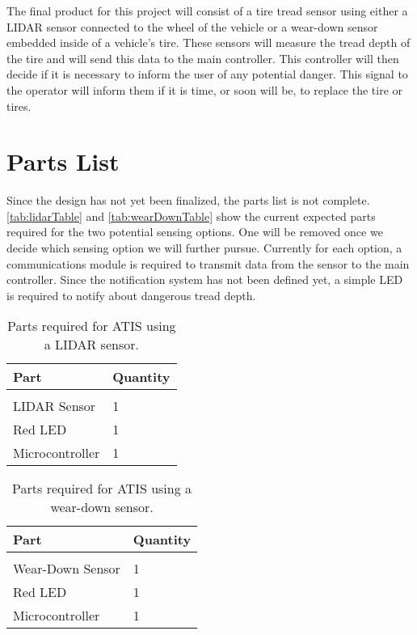 \documentclass[11pt]{IEEEtran}
\begin{document}
		The final product for this project will consist of a tire tread sensor using either a LIDAR sensor connected to the wheel of the vehicle or a wear-down sensor embedded inside of a vehicle's tire. These sensors will measure the tread depth of the tire and will send this data to the main controller. This controller will then decide if it is necessary to inform the user of any potential danger. This signal to the operator will inform them if it is time, or soon will be, to replace the tire or tires.

	\section{Parts List}
		Since the design has not yet been finalized, the parts list is not complete. \autoref{tab:lidarTable} and \autoref{tab:wearDownTable} show the current expected parts required for the two potential sensing options. One will be removed once we decide which sensing option we will further pursue. Currently for each option, a communications module is required to transmit data from the sensor to the main controller. Since the notification system has not been defined yet, a simple LED is required to notify about dangerous tread depth.

		\begin{table}[t]
			\begin{center}
				\caption{Parts required for ATIS using a LIDAR sensor.}
				\label{tab:lidarTable}
				\begin{tabular}{l|l}
					Part 			& Quantity  \\
					\hline
					\vspace{-0.1in}	&	\\
					LIDAR Sensor 	& 1 \\
					Red LED 		& 1 \\
					Microcontroller	& 1 
				\end{tabular}
			\end{center}
		\end{table}

		\begin{table}[t]
			\begin{center}
				\caption{Parts required for ATIS using a wear-down sensor.}
				\label{tab:wearDownTable}
				\begin{tabular}{l|l}
					Part 				& Quantity  \\
					\hline
					\vspace{-0.1in}		&	\\
					Wear-Down Sensor 	& 1 \\
					Red LED 			& 1 \\
					Microcontroller 	& 1
				\end{tabular}
			\end{center}
		\end{table}
\end{document}

